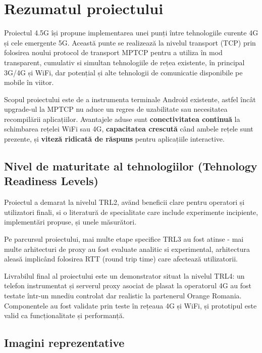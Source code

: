 \chapter{Rezumatul proiectului}

Proiectul 4.5G își propune implementarea unei punți între tehnologiile
curente 4G și cele emergente 5G. Această punte se realizează la
nivelul transport (TCP) prin folosirea noului protocol de transport
MPTCP pentru a utiliza în mod transparent, cumulativ si simultan
tehnologiile de rețea existente, în principal 3G/4G și WiFi, dar
potențial și alte tehnologii de comunicatie disponibile pe mobile în
viitor.


Scopul proiectului este de a instrumenta terminale Android existente,
astfel încât upgrade-ul la MPTCP nu aduce un regres de uzabilitate sau
necesitatea recompilării aplicațiilor. Avantajele aduse sunt {\bf
  conectivitatea continuă} la schimbarea rețelei WiFi sau 4G, {\bf
  capacitatea crescută} când ambele rețele sunt prezente, și {\bf
  viteză ridicată de răspuns} pentru aplicațiile interactive.


\section{ Nivel de maturitate al tehnologiilor (Tehnology Readiness Levels)}

Proiectul a demarat la nivelul TRL2, avănd beneficii clare pentru
operatori și utilizatori finali, si o literatură de specialitate care
include experimente incipiente, implementări propuse, și unele măsurători. 

Pe parcursul proiectului, mai multe etape specifice TRL3 au fost
atinse - mai multe arhitecturi de proxy au fost evaluate analitic si
experimental, arhitectura aleasă implicând folosirea RTT (round trip
time) care afectează utilizatorii.  

Livrabilul final al proiectului este un demonstrator situat la nivelul
TRL4: un telefon instrumentat și serverul proxy asociat de plasat la
operatorul 4G au fost testate într-un mnediu controlat dar realistic
la partenerul Orange Romania. Componentele au fost validate prin teste
în rețeaua 4G și WiFi, și prototipul este valid ca funcționalitate și
performanță.

\pagebreak

\section{Imagini reprezentative}

